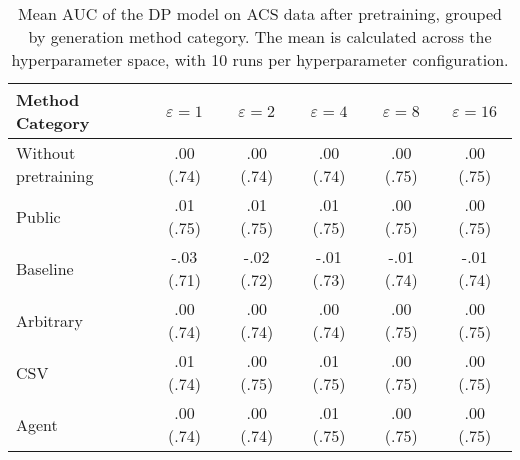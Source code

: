 \begin{table}[h!]
    \centering
    \caption{Mean AUC of the DP model on ACS data after pretraining, grouped by generation method category. The mean is calculated across the hyperparameter space, with 10 runs per hyperparameter configuration.}
    \label{tab:epsilon_comparison}
    \begin{tabular}{lccccc}
    \toprule
    Method Category & $\varepsilon=1$ & $\varepsilon=2$ & $\varepsilon=4$ & $\varepsilon=8$ & $\varepsilon=16$ \\
    \midrule
    Without pretraining & .00 {\small (.74)} & .00 {\small (.74)} & .00 {\small (.74)} & .00 {\small (.75)} & .00 {\small (.75)} \\
    \arrayrulecolor{black!50!}\midrule
    Public & \cellcolor{gold!30}.01 {\small (.75)} & \cellcolor{gold!30}.01 {\small (.75)} & \cellcolor{gold!30}.01 {\small (.75)} & \cellcolor{silver!30}.00 {\small (.75)} & \cellcolor{gold!30}.00 {\small (.75)} \\
    \arrayrulecolor{black!50!}\midrule
    Baseline & -.03 {\small (.71)} & -.02 {\small (.72)} & -.01 {\small (.73)} & -.01 {\small (.74)} & -.01 {\small (.74)} \\
    \arrayrulecolor{black!50!}\midrule
    Arbitrary & .00 {\small (.74)} & .00 {\small (.74)} & .00 {\small (.74)} & .00 {\small (.75)} & \cellcolor{bronze!30}.00 {\small (.75)} \\
    \arrayrulecolor{black!50!}\midrule
    CSV & \cellcolor{silver!30}.01 {\small (.74)} & \cellcolor{silver!30}.00 {\small (.75)} & \cellcolor{silver!30}.01 {\small (.75)} & \cellcolor{gold!30}.00 {\small (.75)} & \cellcolor{gold!30}.00 {\small (.75)} \\
    Agent & \cellcolor{bronze!30}.00 {\small (.74)} & \cellcolor{bronze!30}.00 {\small (.74)} & \cellcolor{bronze!30}.01 {\small (.75)} & \cellcolor{bronze!30}.00 {\small (.75)} & \cellcolor{silver!30}.00 {\small (.75)} \\
    \bottomrule
    \end{tabular}
\end{table}